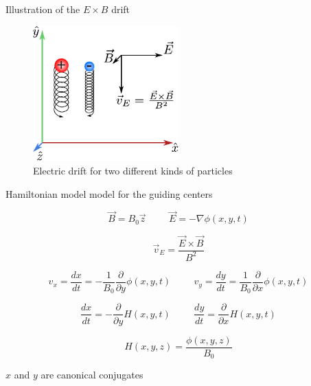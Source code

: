 \documentclass[10pt]{beamer}
\begin{document}
\begin{frame}{Illustration of the $E \times B$ drift}

\begin{figure}[h]
\centering
\includegraphics[width = 0.5\textwidth]{imgs/deriva.pdf}
\caption{Electric drift for two different kinds of particles}
\label{deriva}
\end{figure}

\end{frame}

\begin{frame}{Hamiltonian model model for the guiding centers}

\begin{equation}
\vec{B} = B_0 \vec{z} \hspace{1cm} \vec{E} = - \nabla \phi(x,y,t)
\end{equation}

\begin{equation}
\vec{v}_E = \frac{\vec{E} \times \vec{B}}{B^2}    
\label{eqderiva}
\end{equation}

\begin{equation}
v_x = \frac{dx}{dt} = -\frac{1}{B_0}\frac{\partial}{\partial y} \phi(x,y,t) \hspace{1cm} v_y = \frac{dy}{dt} = \frac{1}{B_0}\frac{\partial}{\partial x} \phi(x,y,t)
\end{equation}

\begin{equation}
\frac{dx}{dt} = -\frac{\partial}{\partial y} H(x,y,t) \hspace{1cm}  \frac{dy}{dt} = \frac{\partial}{\partial x} H(x,y,t)
\label{eqvs}
\end{equation}

\begin{equation}
H(x,y,z) = \frac{\phi(x,y,z)}{B_0}
\end{equation}

$x$ and $y$ are canonical conjugates

\end{frame}
\end{document}
